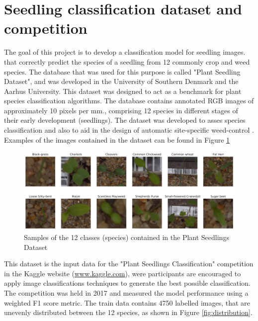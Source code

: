 \documentclass[10pt,onecolumn,titlepage,letterpaper]{article}
\begin{document}


\section{Seedling classification dataset and competition}

The goal of this project is to develop a classification model for seedling images. that correctly predict the species of a seedling from 12 commonly crop and weed species. The database that was used for this purpose is called "Plant Seedling Dataset", and was developed in the University of Southern Denmark and the Aarhus University\cite{Giselsson2017}. This dataset  was designed to act as a benchmark for plant species classification algorithms. The database contains annotated RGB images of approximately 10 pixels per mm., comprising 12 species in different stages of their early development (seedlings). The dataset was developed to asses species classification and also to aid in the design of automatic site-specific weed-control \cite{Giselsson2017}. Examples of the images contained in the dataset can be found in Figure \ref{fig:samples}

\begin{figure}[h]
	\begin{center}
		\includegraphics[width=0.7\linewidth]{samples_images.pdf}
	\end{center}
	\caption{Samples of the 12 classes (species) contained in the Plant Seedlings Dataset}
	\label{fig:samples}
\end{figure}

This dataset is the input data for the "Plant Seedlings Classification" competition in the Kaggle website (\url{www.kaggle.com}), were participants are encouraged to apply image classifications techniques to generate the best possible classification. The competition was held in 2017 and measured the model performance using a weighted F1 score metric. The train data contains 4750 labelled images, that are unevenly distributed between the 12 species, as shown in Figure \ref{fig:distribution}. 
\end{document}
